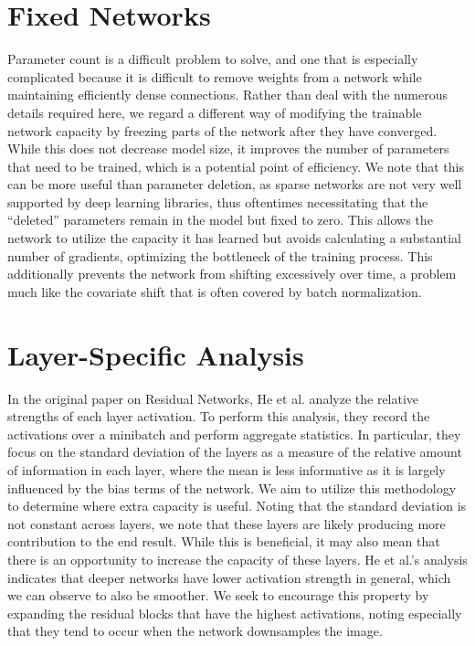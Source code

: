 \section{Fixed Networks}
Parameter count is a difficult problem to solve, and one that is especially complicated because it is difficult to remove weights from a network while maintaining efficiently dense connections.
Rather than deal with the numerous details required here, we regard a different way of modifying the trainable network capacity by freezing parts of the network after they have converged.
While this does not decrease model size, it improves the number of parameters that need to be trained, which is a potential point of efficiency.
We note that this can be more useful than parameter deletion, as sparse networks are not very well supported by deep learning libraries, thus oftentimes necessitating that the ``deleted'' parameters remain in the model but fixed to zero.
This allows the network to utilize the capacity it has learned but avoids calculating a substantial number of gradients, optimizing the bottleneck of the training process.
This additionally prevents the network from shifting excessively over time, a problem much like the covariate shift that is often covered by batch normalization.

\section{Layer-Specific Analysis}
In the original paper on Residual Networks, He et al. analyze the relative strengths of each layer activation.
To perform this analysis, they record the activations over a minibatch and perform aggregate statistics.
In particular, they focus on the standard deviation of the layers as a measure of the relative amount of information in each layer, where the mean is less informative as it is largely influenced by the bias terms of the network.
We aim to utilize this methodology to determine where extra capacity is useful.
Noting that the standard deviation is not constant across layers, we note that these layers are likely producing more contribution to the end result.
While this is beneficial, it may also mean that there is an opportunity to increase the capacity of these layers.
He et al.'s analysis indicates that deeper networks have lower activation strength in general, which we can observe to also be smoother.
We seek to encourage this property by expanding the residual blocks that have the highest activations, noting especially that they tend to occur when the network downsamples the image.

